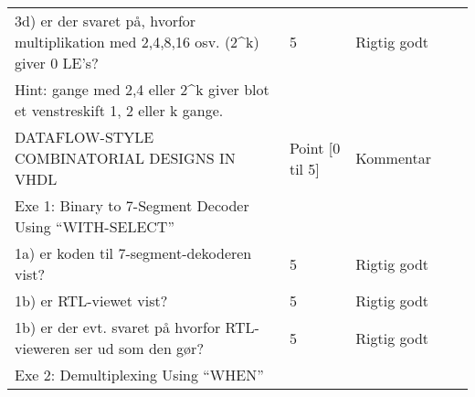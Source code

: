 \documentclass[../journal.tex]{subfiles}
\begin{document}
\begin{table}[p]
\begin{tabular}{lllll}
   3d) er der svaret på, hvorfor multiplikation med 2,4,8,16 osv. (2\textasciicircum{}k) giver 0 LE’s?                                       & 5                                        & Rigtig godt                                            &                       &                       \\
   Hint: gange med 2,4 eller 2\textasciicircum{}k giver blot et venstreskift 1, 2 eller k gange.                                             &                                          &                                                        &                       &                       \\
   DATAFLOW-STYLE COMBINATORIAL DESIGNS IN VHDL                                                                                              & Point {[}0 til 5{]}                      & Kommentar                                              &                       &                       \\
   Exe 1: Binary to 7-Segment Decoder Using “WITH-SELECT”                                                                                    &                                          &                                                        &                       &                       \\
   1a) er koden til 7-segment-dekoderen vist?                                                                                                & 5                                        & Rigtig godt                                            &                       &                       \\
   1b) er RTL-viewet vist?                                                                                                                   & 5                                        & Rigtig godt                                            &                       &                       \\
   1b) er der evt. svaret på hvorfor RTL-vieweren ser ud som den gør?                                                                        & 5                                        & Rigtig godt                                            &                       &                       \\
   Exe 2: Demultiplexing Using “WHEN”                                                                                                        &                                          &                                                        &                       &                       \\

\end{tabular}
\end{table}
\end{document}
